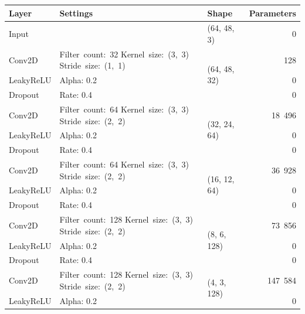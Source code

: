 \begin{table}
    \begin{center}
        \begin{tabular}{ |m{5em}|m{9em}|l|r| }
            \hline
                Layer & Settings & Shape & \multicolumn{1}{l|}{Parameters} \\
            \hline
            \hline
                Input & & (64, 48, 3) & 0 \\
            \hline
                Conv2D & \mbox{Filter count: 32} \mbox{Kernel size: (3, 3)} \mbox{Stride size: (1, 1)} & \multirow{3}{6em}{(64, 48, 32)} & 128 \\
            \cline{1-2} \cline{4-4}
                LeakyReLU & Alpha: 0.2 & & 0 \\
            \cline{1-2} \cline{4-4}
                Dropout & Rate: 0.4 & & 0 \\
            \hline
                Conv2D & \mbox{Filter count: 64} \mbox{Kernel size: (3, 3)} \mbox{Stride size: (2, 2)} & \multirow{3}{6em}{(32, 24, 64)} & 18~496 \\
            \cline{1-2} \cline{4-4}
                LeakyReLU & Alpha: 0.2 & & 0 \\
            \cline{1-2} \cline{4-4}
                Dropout & Rate: 0.4 & & 0 \\
            \hline
                Conv2D & \mbox{Filter count: 64} \mbox{Kernel size: (3, 3)} \mbox{Stride size: (2, 2)} & \multirow{3}{6em}{(16, 12, 64)} & 36~928 \\
            \cline{1-2} \cline{4-4}
                LeakyReLU & Alpha: 0.2 & & 0 \\
            \cline{1-2} \cline{4-4}
                Dropout & Rate: 0.4 & & 0 \\
            \hline
                Conv2D & \mbox{Filter count: 128} \mbox{Kernel size: (3, 3)} \mbox{Stride size: (2, 2)} & \multirow{3}{6em}{(8, 6, 128)} & 73~856 \\
            \cline{1-2} \cline{4-4}
                LeakyReLU & Alpha: 0.2 & & 0 \\
            \cline{1-2} \cline{4-4}
                Dropout & Rate: 0.4 & & 0 \\
            \hline
                Conv2D & \mbox{Filter count: 128} \mbox{Kernel size: (3, 3)} \mbox{Stride size: (2, 2)} & \multirow{3}{6em}{(4, 3, 128)} & 147~584 \\
            \cline{1-2} \cline{4-4}
                LeakyReLU & Alpha: 0.2 & & 0 \\

\end{tabular}
\end{center}
\end{table}

